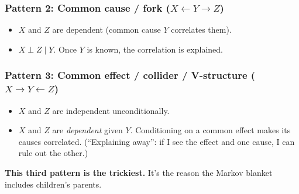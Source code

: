 \documentclass[11pt, a4paper]{article}
\begin{document}
\subsubsection*{Pattern 2: Common cause / fork ($X \leftarrow Y \to Z$)}

\begin{itemize}
  \item $X$ and $Z$ are dependent (common cause $Y$ correlates them).
  \item $X \perp Z \mid Y$. Once $Y$ is known, the correlation is explained.
\end{itemize}

\subsubsection*{Pattern 3: Common effect / collider / V-structure ($X \to Y \leftarrow Z$)}

\begin{itemize}
  \item $X$ and $Z$ are independent unconditionally.
  \item $X$ and $Z$ are \emph{dependent} given $Y$. Conditioning on a common effect makes its causes correlated. (``Explaining away'': if I see the effect and one cause, I can rule out the other.)
\end{itemize}

\textbf{This third pattern is the trickiest.} It's the reason the Markov blanket includes children's parents.
\end{document}

